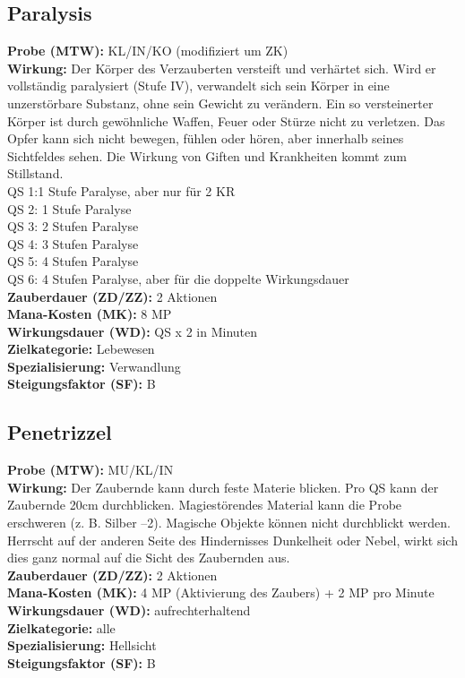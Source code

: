 \subsection{Paralysis}
\label{chap:paralysis}
\textbf{Probe (MTW):} KL/IN/KO (modifiziert um ZK) \\
\textbf{Wirkung:} Der  Körper  des  Verzauberten  versteift und verhärtet sich. Wird er vollständig paralysiert (Stufe IV), verwandelt sich sein Körper in eine unzerstörbare Substanz, ohne sein Gewicht zu verändern. Ein so versteinerter Körper ist durch gewöhnliche Waffen, Feuer oder Stürze nicht zu verletzen. Das  Opfer  kann  sich  nicht  bewegen,  fühlen  oder hören, aber innerhalb seines Sichtfeldes sehen. Die Wirkung  von  Giften  und  Krankheiten  kommt  zum Stillstand.\\
QS 1:1 Stufe Paralyse, aber nur für 2 KR\\
QS 2: 1 Stufe Paralyse\\
QS 3: 2 Stufen Paralyse\\
QS 4: 3 Stufen Paralyse\\
QS 5: 4 Stufen Paralyse\\
QS 6: 4 Stufen Paralyse, aber für die doppelte Wirkungsdauer\\
\textbf{Zauberdauer (ZD/ZZ):} 2 Aktionen \\
\textbf{Mana-Kosten (MK):} 8 MP \\
\textbf{Wirkungsdauer (WD):} QS x 2 in Minuten \\
\textbf{Zielkategorie:} Lebewesen \\
\textbf{Spezialisierung:} Verwandlung \\
\textbf{Steigungsfaktor (SF):} B


\subsection{Penetrizzel}
\label{chap:penetrizzel}
\textbf{Probe (MTW):} MU/KL/IN \\
\textbf{Wirkung:} Der Zaubernde kann durch feste Materie blicken. Pro QS kann der Zaubernde 20cm durchblicken. Magiestörendes Material kann die Probe erschweren (z. B. Silber –2). Magische Objekte können nicht durchblickt werden. Herrscht auf der anderen Seite des Hindernisses Dunkelheit oder Nebel, wirkt sich dies ganz normal auf die Sicht des Zaubernden aus. \\
\textbf{Zauberdauer (ZD/ZZ):} 2 Aktionen \\
\textbf{Mana-Kosten (MK):} 4 MP (Aktivierung des Zaubers) + 2 MP pro Minute \\
\textbf{Wirkungsdauer (WD):} aufrechterhaltend \\
\textbf{Zielkategorie:} alle \\
\textbf{Spezialisierung:} Hellsicht \\
\textbf{Steigungsfaktor (SF):} B


